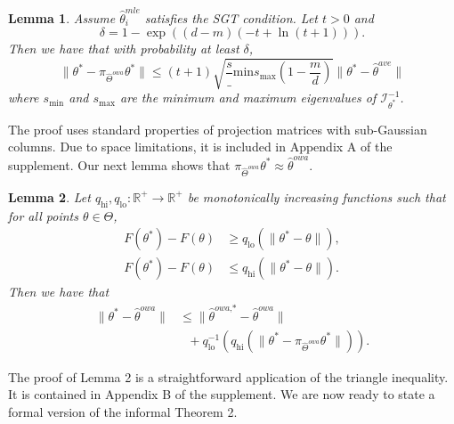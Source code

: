 \documentclass[twoside]{article}
\newtheorem{lemma}{Lemma}
\newcommand{\smin}{s_\text{min}}
\newcommand{\smax}{s_\text{max}}
\newcommand{\qhi}{q_\text{hi}}
\newcommand{\qlo}{q_\text{lo}}
\newcommand{\W}{{\hat \Theta^{\textit{owa}}}}
\newcommand{\w}{\theta}
\newcommand{\wowa}{\hat\w^{owa}}
\newcommand{\wowastar}{\hat\w^{\textit{owa,*}}}
\newcommand{\wave}{\hat\w^{ave}}
\newcommand{\wmle}{\hat\w^{mle}}
\newcommand{\wstar}{{\w^{*}}}
\newcommand{\I}{\mathcal I}
\newcommand{\ltwo}[1]{{\lVert {#1} \rVert}}
\newcommand{\proj}[1]{\pi_{{#1}}}
\begin{document}

\begin{lemma}
\label{lem:proj}
Assume $\wmle_i$ satisfies the SGT condition.
Let $t>0$ and
\begin{equation}
\delta = 1-\exp((d-m)(-t+\ln(t+1)))
.
\label{eq:delta}
\end{equation}
Then we have that with probability at least $\delta$,
\begin{equation}
\ltwo{\wstar-\proj\W\wstar}
\le
(t+1)\sqrt{\frac\smin\smax\left(1-\frac{m}{d}\right)}\ltwo{\wstar - \wave}
\end{equation}
where $\smin$ and $\smax$ are the minimum and maximum eigenvalues of $\I_\wstar^{-1}$.
\end{lemma}

The proof uses standard properties of projection matrices with sub-Gaussian columns.
Due to space limitations, it is included in Appendix A of the supplement.
%
%
Our next lemma shows that $\proj{\W}\wstar \approx \wowa$.

\begin{lemma}
Let $\qhi,\qlo : \mathbb{R}^+ \to \mathbb{R}^+$ be monotonically increasing functions such that for all points $\w\in\Theta$,
\begin{align}
F(\wstar) - F(\w) &\ge \qlo \left( \ltwo {\wstar - \w} \right)
,
\\
F(\wstar) - F(\w) &\le \qhi \left( \ltwo {\wstar - \w} \right)
.
\end{align}
Then we have that
\begin{equation}
\begin{aligned}
\ltwo {\wstar-\wowa}
&\le
\ltwo{\wowastar-\wowa}
\\
&~~~+
\qlo^{-1} \left(
    \qhi \left( \ltwo {\wstar - \proj\W\wstar} \right)
\right)
.
\label{eq:lemma2res}
\end{aligned}
\end{equation}
\end{lemma}

The proof of Lemma 2 is a straightforward application of the triangle inequality.
It is contained in Appendix B of the supplement.
We are now ready to state a formal version of the informal Theorem 2.

\end{document}
